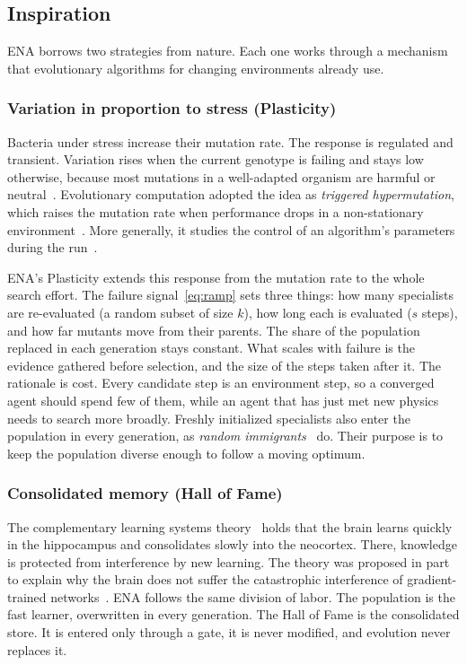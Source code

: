 \subsection{Inspiration}
\label{sec:inspiration}
ENA borrows two strategies from nature. Each one works through a mechanism that evolutionary algorithms for changing environments already use.

\subsubsection{Variation in proportion to stress (Plasticity)}
Bacteria under stress increase their mutation rate. The response is regulated and transient. Variation rises when the current genotype is failing and stays low otherwise, because most mutations in a well-adapted organism are harmful or neutral~\citep{galhardo2007mutation}. Evolutionary computation adopted the idea as \textit{triggered hypermutation}, which raises the mutation rate when performance drops in a non-stationary environment~\citep{cobb1990investigation}. More generally, it studies the control of an algorithm's parameters during the run~\citep{karafotias2015parameter}.

ENA's Plasticity extends this response from the mutation rate to the whole search effort. The failure signal~\eqref{eq:ramp} sets three things: how many specialists are re-evaluated (a random subset of size $k$), how long each is evaluated ($s$ steps), and how far mutants move from their parents. The share of the population replaced in each generation stays constant. What scales with failure is the evidence gathered before selection, and the size of the steps taken after it. The rationale is cost. Every candidate step is an environment step, so a converged agent should spend few of them, while an agent that has just met new physics needs to search more broadly. Freshly initialized specialists also enter the population in every generation, as \textit{random immigrants}~\citep{tinos2007self} do. Their purpose is to keep the population diverse enough to follow a moving optimum.

\subsubsection{Consolidated memory (Hall of Fame)}
The complementary learning systems theory~\citep{mcclelland1995there,kumaran2016learning} holds that the brain learns quickly in the hippocampus and consolidates slowly into the neocortex. There, knowledge is protected from interference by new learning. The theory was proposed in part to explain why the brain does not suffer the catastrophic interference of gradient-trained networks~\citep{mccloskey1989catastrophic}. ENA follows the same division of labor. The population is the fast learner, overwritten in every generation. The Hall of Fame is the consolidated store. It is entered only through a gate, it is never modified, and evolution never replaces it.

